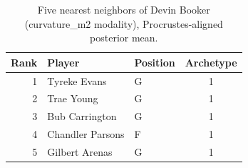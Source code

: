 \begin{table}[htbp]
  \centering\small
  \begin{tabular}{rllc}
    \toprule
    Rank & Player & Position & Archetype \\
    \midrule
    1 & Tyreke Evans & G & 1 \\
    2 & Trae Young & G & 1 \\
    3 & Bub Carrington & G & 1 \\
    4 & Chandler Parsons & F & 1 \\
    5 & Gilbert Arenas & G & 1 \\
    \bottomrule
  \end{tabular}
  \caption{Five nearest neighbors of Devin Booker (curvature_m2 modality), Procrustes-aligned posterior mean.}
  \label{tab:Devin_Booker_neighbors_curvature_m2}
\end{table}

